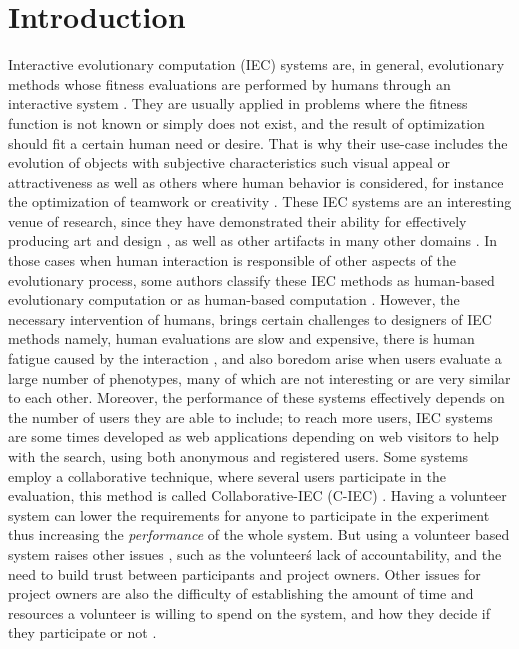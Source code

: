 \section{Introduction}




Interactive evolutionary computation (IEC) systems are, in general, evolutionary methods
whose fitness evaluations are performed by humans through an interactive 
system \cite{eiben2015interactive}.
They are usually applied in problems where the fitness function is not known or simply
does not exist, and the result of optimization should fit a certain human need or desire. 
That is why their use-case includes the evolution of objects with subjective characteristics
such visual appeal or attractiveness \cite{biomorphs} as well as others where human behavior is 
considered, for instance the optimization of teamwork \cite{kosorukoff2002evolutionary}
or creativity \cite{yu2011cooks}.
These IEC systems are an interesting venue of research, since they have demonstrated 
their ability for effectively 
producing art and design \cite{Bentley:1999:intro,Sims:1991,todd:1992,evoeco},
as well as other artifacts in many other domains \cite{ie1}. In those cases when 
human interaction is responsible of other 
aspects of the evolutionary process, some authors classify these IEC methods 
as human-based evolutionary computation \cite{kosorukoff2001human} 
or as human-based computation \cite{quinn2011human}.
However, the necessary intervention of humans, brings certain challenges 
to designers of IEC methods namely, human evaluations are slow and expensive, there is
human fatigue caused by the interaction \cite{ie1}, and also boredom arise
when users evaluate a large number of phenotypes, 
many of which are not interesting or are very similar to each other.
Moreover, the performance of these systems effectively depends on the number of users
they are able to include; to reach more users,
IEC systems are some times developed as web applications depending on web visitors to help
with the search, using both anonymous and registered users. Some systems 
employ a collaborative technique, where several users participate in 
the evaluation, this method is called Collaborative-IEC (C-IEC)
\cite{picbreeder,seyama2016development,wagy2014collective}.
Having a volunteer system can lower the requirements for anyone to participate in
the experiment thus increasing the {\em performance} of the whole system. But using a volunteer based 
system raises other issues \cite{sarmenta2001volunteer,web:BOINC}, such as the 
volunteer\'s lack of accountability, and the need to build trust between participants and project
owners. Other issues for project owners are also the difficulty of establishing 
the amount of time and resources a volunteer is willing to spend on the system, 
and how they decide if they participate or not \cite{JJ:2016}. 

